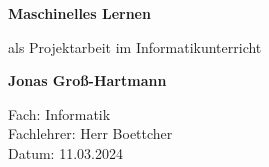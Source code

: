 \begin{titlepage}
    \begin{center}
        \vspace*{1cm}
            
        \Huge
        \textbf{Maschinelles Lernen}
            
        \vspace{0.5cm}
        \LARGE
        als Projektarbeit im Informatikunterricht
            
        \vspace{1.5cm}
            
        \textbf{Jonas Groß-Hartmann}
            
        \vfill
        
        \Large
        Fach: Informatik\\
        Fachlehrer: Herr Boettcher\\
        Datum: 11.03.2024
            
    \end{center}
\end{titlepage}
